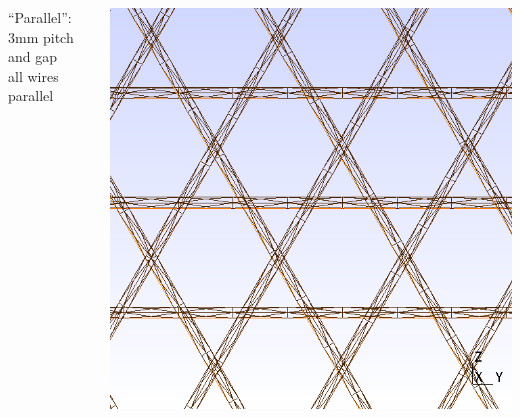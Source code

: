 \documentclass[xcolor=dvipsnames]{beamer}
\begin{document}
\begin{frame}
\begin{columns}
\begin{column}{0.3\textwidth}
\begin{center}
        ``Parallel'':\\3mm pitch and gap\\all wires parallel
      \end{center}
    \end{column}
    \begin{column}{0.3\textwidth}
      \begin{center}
        \includegraphics[height=0.4\textheight]{uboone-mesh.png}      


\end{center}
\end{column}
\end{columns}
\end{frame}
\end{document}
